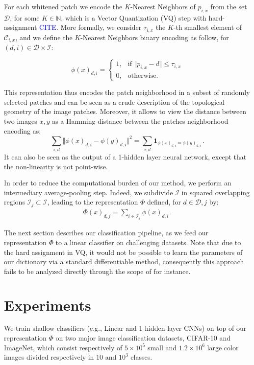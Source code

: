 \documentclass{article}
\newcommand{\Edouard}[1]{\textcolor{blue}{#1}}
\begin{document}
 
For each whitened patch we encode the $K$-Nearest Neighbors of $p_{i,x}$ from the set $\mathcal{D}$, for some $ K \in \mathbb{N}$, which is a Vector Quantization (VQ) step with hard-assignment \Edouard{CITE}.
More formally, we consider $\tau_{i,x}$ the $K$-th smallest  element of $\mathcal{C}_{i,x}$, and we define the $K$-Nearest Neighbors binary encoding as follow, for $(d,i)\in\mathcal{D}\times\mathcal{I}$:


\begin{equation}
\label{encoding}
\phi(x)_{d,i}=
\begin{cases}
1,&\text{if } \Vert  p_{i,x} - d\Vert \leq \tau_{i,x}\\
0,&\text{otherwise}.
\end{cases}
\end{equation}


This representation thus encodes the patch neighborhood in a subset of randomly selected patches and can be seen as a crude description of the topological geometry of the image patches.
Moreover, it allows to view the distance between two images $x,y$ as a Hamming distance between the patches neighborhood encoding as:
\[\sum_{i,d}\Vert \phi(x)_{d,i}-\phi(y)_{d,i}\Vert^2=\sum_{i,d}\mathbf{1}_{\phi(x)_{d,i}=\phi(y)_{d,i}}\,.\]
It can also be seen as the output of a 1-hidden layer neural network, except that the non-linearity is not point-wise.

In order to reduce the computational burden of our method, we perform an intermediary average-pooling step.
Indeed, we subdivide $\mathcal{I}$ in squared overlapping regions $\mathcal{I}_j\subset\mathcal{I}$, leading to the representation $\Phi$ defined, for $d\in\mathcal{D}, j$ by:
\begin{align}\Phi(x)_{d,j}= \sum_{i\in \mathcal{I}_j}\phi(x)_{d,i}\,.\end{align}

The next section describes our classification pipeline, as we feed our representation $\Phi$ to a linear classifier on challenging datasets.
Note that due to the hard assignment  in VQ, it would not be possible to learn the parameters of our dictionary via a standard differentiable method, consequently this approach fails to be analyzed directly through the scope of \cite{chizat2018global} for instance.




\section{Experiments}
\label{experiments}
We train  shallow classifiers (e.g., Linear and 1-hidden layer CNNs) on top of our representation $\Phi$ on two major  image classification datasets,  CIFAR-10 and ImageNet, which consist respectively of $5\times10^5$ small and $1.2\times10^6$ large color images  divided respectively in 10 and $10^3$ classes.
\end{document}

